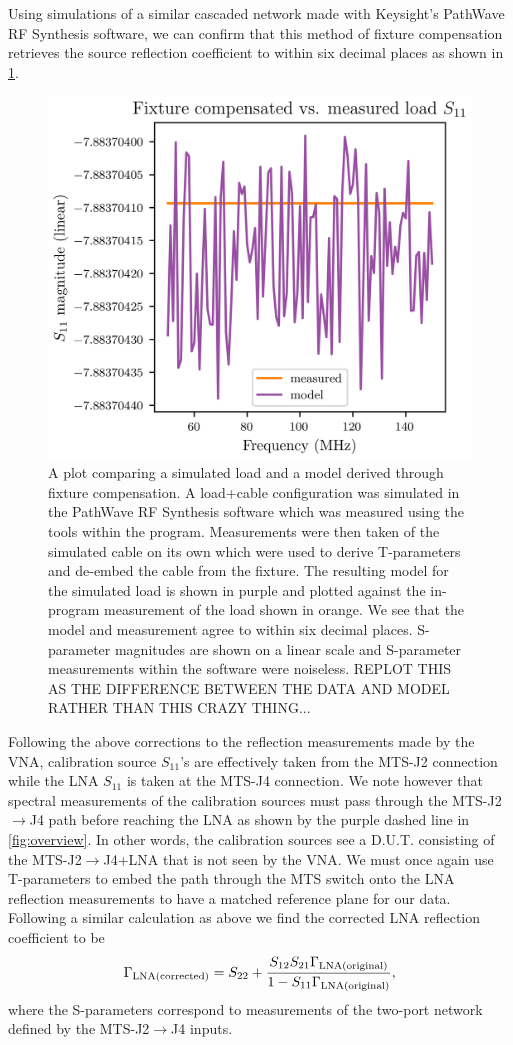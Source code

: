 Using simulations of a similar cascaded network made with Keysight’s PathWave RF Synthesis software, we can confirm that this method of fixture compensation retrieves the source reflection coefficient to within six decimal places as shown in \cref{fig:tparam}.
\begin{figure}
    \centering
    \includegraphics[width=.7\textwidth]{tparam}
    \caption{A plot comparing a simulated load and a model derived through fixture compensation. A load+cable configuration was simulated in the PathWave RF Synthesis software which was measured using the tools within the program. Measurements were then taken of the simulated cable on its own which were used to derive T-parameters and de-embed the cable from the fixture. The resulting model for the simulated load is shown in purple and plotted against the in-program measurement of the load shown in orange. We see that the model and measurement agree to within six decimal places. S-parameter magnitudes are shown on a linear scale and S-parameter measurements within the software were noiseless. REPLOT THIS AS THE DIFFERENCE BETWEEN THE DATA AND MODEL RATHER THAN THIS CRAZY THING...}
    \label{fig:tparam}
\end{figure}

Following the above corrections to the reflection measurements made by the VNA, calibration source $S_{11}$’s are effectively taken from the MTS-J2 connection while the LNA $S_{11}$ is taken at the MTS-J4 connection. We note however that spectral measurements of the calibration sources must pass through the MTS-J2$\rightarrow$J4 path before reaching the LNA as shown by the purple dashed line in \cref{fig:overview}. In other words, the calibration sources see a D.U.T. consisting of the MTS-J2$\rightarrow$J4+LNA that is not seen by the VNA. We must once again use T-parameters to embed the path through the MTS switch onto the LNA reflection measurements to have a matched reference plane for our data. Following a similar calculation as above we find the corrected LNA reflection coefficient to be
\begin{equation}
    \Gamma_{\mathrm{\mathrm{LNA (corrected)}}} = S_{22} + \frac{S_{12}S_{21}\Gamma_{\mathrm{\mathrm{LNA (original)}}}}{1 - S_{11}\Gamma_{\mathrm{\mathrm{LNA (original)}}}},
\end{equation}
where the S-parameters correspond to measurements of the two-port network defined by the MTS-J2$\rightarrow$J4 inputs.

